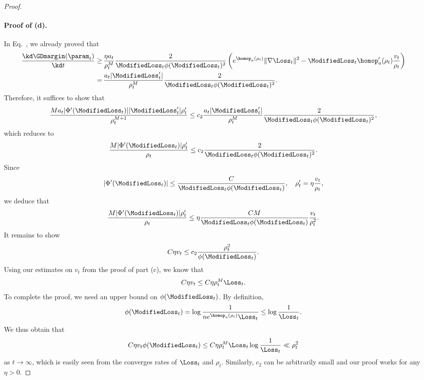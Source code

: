 \begin{proof}
\paragraph{Proof of (d).} In Eq.~, we already proved that
\begin{align*}
    \frac{\kd \GDmargin(\param_t)}{\kd t} \ge \, & \frac{\eta a_t}{\rho_t^{M}} \frac{2}{\ModifiedLoss_t \phi(\ModifiedLoss_t)^2} \left( e^{\homop_a (\rho_t)} \| \nabla \Loss_t \|^2 - \ModifiedLoss_t \homop_a' (\rho_t) \frac{v_t}{\rho_t} \right) \\
    = \, & \frac{a_t \vert \ModifiedLoss_t' \vert}{\rho_t^{M}} \frac{2}{\ModifiedLoss_t \phi(\ModifiedLoss_t)^2}.
\end{align*}
Therefore, it suffices to show that
\begin{equation*}
    \frac{M a_t \vert \Phi'(\ModifiedLoss_t) \vert \vert \ModifiedLoss_t' \vert \rho_t'}{\rho_t^{M+1}} \le c_2 \frac{a_t \vert \ModifiedLoss_t' \vert}{\rho_t^{M}} \frac{2}{\ModifiedLoss_t \phi(\ModifiedLoss_t)^2},
\end{equation*}
which reduces to
\begin{equation*}
    \frac{M \vert \Phi'(\ModifiedLoss_t) \vert \rho_t'}{\rho_t} \le c_2 \frac{2}{\ModifiedLoss_t \phi(\ModifiedLoss_t)^2}.
\end{equation*}
Since
\begin{equation*}
    \vert \Phi'(\ModifiedLoss_t) \vert \le \frac{C}{\ModifiedLoss_t \phi(\ModifiedLoss_t)}, \quad \rho_t' = \eta \frac{v_t}{\rho_t},
\end{equation*}
we deduce that
\begin{align*}
    \frac{M \vert \Phi'(\ModifiedLoss_t) \vert \rho_t'}{\rho_t} \le \eta \frac{C M}{\ModifiedLoss_t \phi(\ModifiedLoss_t)} \frac{v_t}{\rho_t^2}.
\end{align*}
It remains to show
\begin{equation*}
    C \eta v_t \le c_2 \frac{\rho_t^2}{\phi(\ModifiedLoss_t)}.
\end{equation*}
Using our estimates on $v_t$ from the proof of part (c), we know that
\begin{equation*}
    C \eta v_t \le C \eta \rho_t^{M} \Loss_t.
\end{equation*}
To complete the proof, we need an upper bound on $\phi(\ModifiedLoss_t)$. By definition,
\begin{equation*}
    \phi (\ModifiedLoss_t) = \log \frac{1}{n e^{\homop_a(\rho_t)} \Loss_t} \le \log \frac{1}{\Loss_t}.
\end{equation*}
We thus obtain that
\begin{equation*}
    C \eta v_t \phi(\ModifiedLoss_t) \le C \eta \rho_t^{M} \Loss_t \log \frac{1}{\Loss_t} \ll \rho_t^2
\end{equation*}
as $t \to \infty$, which is easily seen from the converges rates of $\Loss_t$ and $\rho_t$.  Similarly, $c_2$ can be arbitrarily small and our proof works for any $\eta > 0$.


\end{proof}
